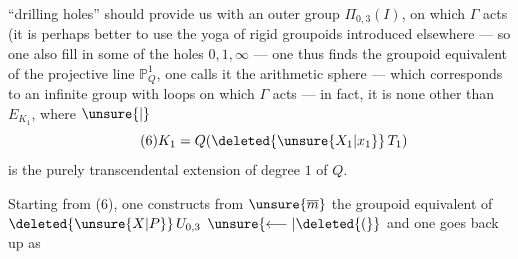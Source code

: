 ``drilling holes'' should provide us with an outer group $\Pi_{0,3}(I)$,  on which $\Gamma$ acts (it is perhaps better to use the yoga of rigid groupoids introduced elsewhere — so one   also fill in some of the holes $0,1,\infty$ — one thus finds the groupoid equivalent of the  projective line $\mathbb P^1_Q$, one calls it the arithmetic sphere — which corresponds to an infinite  group with loops on which $\Gamma$ acts — in fact, it is none other than $E_{K_1}$, where $\unsure{\vert}$
\[
\tag{6}K_1=Q(\deleted{\unsure{X_1|x_1}}\,T_1)
\]
is the  purely transcendental extension of degree $1$ of $Q$.

Starting from (6), one constructs from $\unsure{\overline m}$ the groupoid equivalent of $\deleted{\unsure{X|P}}\,U_{0,3}$ $\unsure{\longleftarrow|\deleted{(}}$ and one goes back up as
